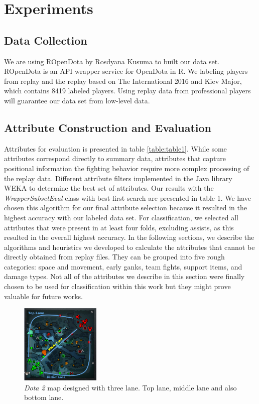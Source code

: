 \section{Experiments}
\label{sec:exp}

\subsection{Data Collection}
\label{sec:datacollection}

We are using ROpenDota by Rosdyana Kusuma to built our data set. ROpenDota is an API wrapper service for OpenDota in R. We labeling players from replay and the replay based on The International 2016 and Kiev Major, which contains 8419 labeled players. Using replay data from professional players will guarantee our data set from low-level data.

\subsection{Attribute Construction and Evaluation}
\label{sec:attconsandeval}

Attributes for evaluation is presented in table \ref{table:table1}. While some attributes correspond directly to summary data, attributes that capture positional information the fighting behavior require more complex processing of the replay data. Different attribute filters implemented in the Java library WEKA \cite{hall2009weka} to determine the best set of attributes. Our results with the \textit{WrapperSubsetEval} class with best-first search are presented in table 1. We have chosen this algorithm for our final attribute selection because it resulted in the highest accuracy with our labeled data set. For classification, we selected all attributes that were present in at least four folds, excluding assists, as this resulted in the overall highest accuracy. In the following sections, we describe the algorithms and heuristics we developed to calculate the attributes that cannot be directly obtained from replay files. They can be grouped into five rough categories: space and movement, early ganks, team fights, support items, and damage types. Not all of the attributes we describe in this section were finally chosen to be used for classification within this work but they might prove valuable for future works.

\begin{figure}
\centering
\includegraphics[width=1.5in]{./figures/lane_map.png}
\caption{\textit{Dota 2} map designed with three lane. Top lane, middle lane and also bottom lane.}
\label{fig:map_lane}
\end{figure}


